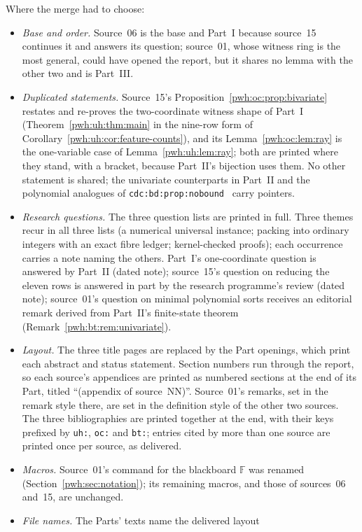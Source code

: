 \documentclass[11pt,letterpaper]{article}
\numberwithin{equation}{section}
\theoremstyle{definition}
\newcommand{\Fbb}{\mathbb F}
\begin{document}
Where the merge had to choose:
\begin{itemize}
\item \emph{Base and order.} Source~06 is the base and Part~I because
source~15 continues it and answers its question; source~01, whose witness
ring is the most general, could have opened the report, but it shares no
lemma with the other two and is Part~III.
\item \emph{Duplicated statements.} Source~15's
Proposition~\ref{pwh:oc:prop:bivariate} restates and re-proves the
two-coordinate witness shape of Part~I (Theorem~\ref{pwh:uh:thm:main} in
the nine-row form of Corollary~\ref{pwh:uh:cor:feature-counts}), and its
Lemma~\ref{pwh:oc:lem:ray} is the one-variable case of
Lemma~\ref{pwh:uh:lem:ray}; both are printed where they stand, with a
bracket, because Part~II's bijection uses them. No other statement is
shared; the univariate counterparts in Part~II and the polynomial analogues
of \texttt{cdc:bd:prop:nobound}~\cite{cdc} carry pointers.
\item \emph{Research questions.} The three question lists are printed in
full. Three themes recur in all three lists (a numerical universal
instance; packing into ordinary integers with an exact fibre ledger;
kernel-checked proofs); each occurrence carries a note naming the others.
Part~I's one-coordinate question is answered by Part~II (dated note);
source~15's question on reducing the eleven rows is answered in part by the
research programme's review (dated note); source~01's question on minimal
polynomial sorts receives an editorial remark derived from Part~II's
finite-state theorem (Remark~\ref{pwh:bt:rem:univariate}).
\item \emph{Layout.} The three title pages are replaced by the Part
openings, which print each abstract and status statement. Section numbers
run through the report, so each source's appendices are printed as
numbered sections at the end of its Part, titled ``(appendix of
source~NN)''. Source~01's remarks, set in the remark style there, are set
in the definition style of the other two sources. The three bibliographies
are printed together at the end, with their keys prefixed by
\texttt{uh:}, \texttt{oc:} and \texttt{bt:}; entries cited by more than one
source are printed once per source, as delivered.
\item \emph{Macros.} Source~01's command for the blackboard $\Fbb$ was
renamed (Section~\ref{pwh:sec:notation}); its remaining macros, and those of
sources~06 and~15, are unchanged.
\item \emph{File names.} The Parts' texts name the delivered layout

\end{itemize}
\end{document}
